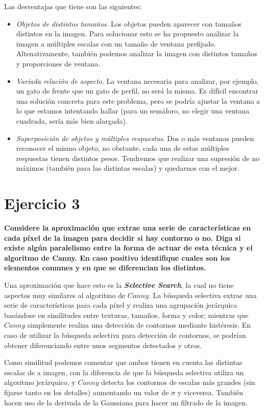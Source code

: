 \documentclass[11pt,a4paper]{article}
\begin{document}
Las desventajas que tiene son las siguientes:
\begin{itemize}
	\item \textit{Objetos de distintos tamaños}. Los objetos pueden aparecer con tamaños distintos en la imagen. Para solucionar esto se ha propuesto analizar
          la imagen a múltiples escalas con un tamaño de ventana prefijado. Altenativamente, también podemos analizar la imagen con distintos tamaños y proporciones
          de ventana.
	\item \textit{Variada relación de aspecto}. La ventana necesaria para analizar, por ejemplo, un gato de frente que un gato de perfil, no será la misma.
		  Es difícil encontrar una solución concreta para este problema, pero se podría ajustar la ventana a lo que estamos intentando hallar (para un semáforo,
          no elegir una ventana cuadrada, sería más bien alargada).
	\item \textit{Superposición de objetos y múltiples respuestas}. Dos o más ventanas pueden reconocer el mismo objeto, no obstante, cada una de estas múltiples
		  respuestas tienen distintos pesos. Tendremos que realizar una supresión de no máximos (también para las distintas escalas) y quedarnos con el mejor.
\end{itemize}


\section*{Ejercicio 3}

\textbf{Considere la aproximación que extrae una serie de características en cada píxel de la imagen para decidir si hay contorno o no. Diga si existe algún
paralelismo entre la forma de actuar de esta técnica y el algoritmo de Canny. En caso positivo identifique cuales son los elementos comunes y en que se
diferencian los distintos.}

Una aproximación que hace esto es la \textbf{\textit{Selective Search}}, la cual no tiene aspectos muy similares al algoritmo de $Canny$. La búsqueda selectiva
extrae una serie de características para cada píxel y realiza una agrupación jerárquica basándose en similitudes entre texturas, tamaños, forma y color; mientras
que $Canny$ simplemente realiza una detección de contornos mediante histéresis. En caso de utilizar la búsqueda selectiva para detección de contornos, se podrían
obtener diferenciando entre unos segmentos detectados y otros.

Como similitud podemos comentar que ambos tienen en cuenta las distintas escalas de a imagen, con la diferencia de que la búsqueda selectiva utiliza un algoritmo
jerárquico, y $Canny$ detecta los contornos de escalas más grandes (sin fijarse tanto en los detalles) aumentando un valor de $\sigma$ y viceversa. También hacen
uso de la derivada de la Gaussiana para hacer un filtrado de la imagen.
\end{document}
